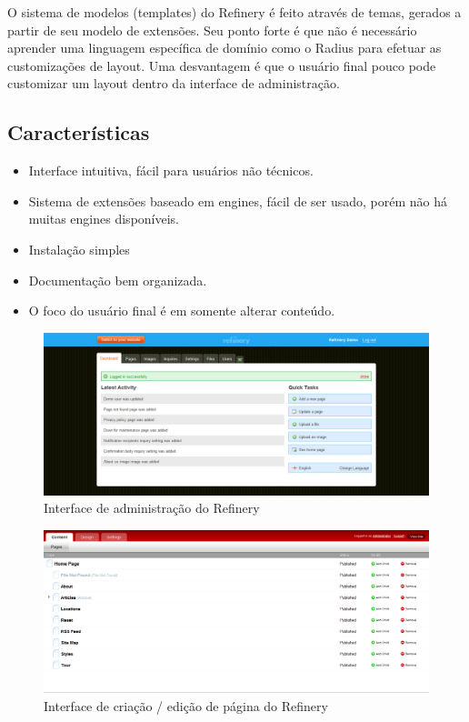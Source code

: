 O sistema de modelos (templates) do Refinery é feito através de temas, gerados a partir de seu modelo de extensões. Seu ponto forte é que não é necessário aprender uma linguagem específica de domínio como o Radius para efetuar as customizações de layout. Uma desvantagem é que o usuário final pouco pode customizar um layout dentro da interface de administração.

\subsection{Características}

\begin{itemize}
  \item Interface intuitiva, fácil para usuários não técnicos.
  \item Sistema de extensões baseado em engines, fácil de ser usado, porém não há muitas engines disponíveis.
  \item Instalação simples
  \item Documentação bem organizada.
  \item O foco do usuário final é em somente alterar conteúdo.
\end{itemize}

\begin{figure}[here]
\includegraphics[width=150mm]{images/refinery_admin.png}
\caption{Interface de administração do Refinery}
\label{fig:refinery_admin.png}
\end{figure}

\begin{figure}[here]
\includegraphics[width=150mm]{images/radiant_admin.png}
\caption{Interface de criação / edição de página do Refinery}
\label{fig:refinery_admin.png}
\end{figure}

